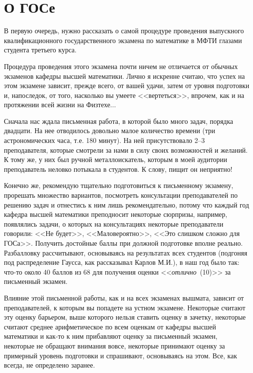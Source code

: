 \chapter[О ГОСе]{О ГОСе\footnotemark}
В первую очередь, нужно рассказать о самой процедуре проведения выпускного квалификационного государственного экзамена по математике в МФТИ глазами студента третьего курса. 

Процедура проведения этого экзамена почти ничем не отличается от обычных экзаменов кафедры высшей математики. 
Лично я искренне считаю, что успех на этом экзамене зависит, прежде всего, от вашей удачи, затем от уровня подготовки и, напоследок, от того, насколько вы умеете <<вертеться>>, впрочем, как и на протяжении всей жизни на Физтехе...

Сначала нас ждала письменная работа, в которой было много задач, порядка двадцати. На нее отводилось довольно малое количество времени (три астрономических часа, т.е. 180 минут). На ней присутствовало 2--3 преподавателя, которые смотрели за нами в силу своих возможностей и желаний. К тому же, у них был ручной металлоискатель, которым в моей аудитории преподаватель неловко потыкала в студентов. К слову, пищит он неприятно! 

Конечно же, рекомендую тщательно подготовиться к письменному экзамену, прорешать множество вариантов, посмотреть консультации преподавателей по решению задач и отнестись к ним лишь рекомендательно, потому что каждый год кафедра высшей математики преподносит некоторые сюрпризы, например, появлялись задачи, о которых на консультациях некоторые преподаватели говорили: <<Не будет>>, <<Маловероятно>>, <<Это слишком сложно для ГОСа>>. Получить достойные баллы при должной подготовке вполне реально. Разбалловку рассчитывают, основываясь на результатах всех студентов (подгоняя под распределение Гаусса, как рассказывал Карлов М.И.), в наш год было так: что-то около 40 баллов из 68 для получения оценки <<\textit{отлично}~(10)>> за письменный экзамен.

Влияние этой письменной работы, как и на всех экзаменах вышмата, зависит от преподавателей, к которым вы попадете на устном экзамене. Некоторые считают эту оценку барьером, выше которого нельзя ставить оценку в зачетку, некоторые считают среднее арифметическое по всем оценкам от кафедры высшей математики и как-то к ним прибавляют оценку за письменный экзамен, некоторые не обращают внимания вовсе, некоторые принимают оценку за примерный уровень подготовки и спрашивают, основываясь на этом. Все, как всегда, не определено заранее.

